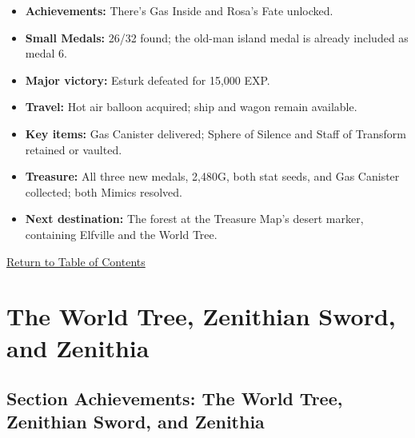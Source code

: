 \documentclass[
  american,
  10pt,
  letterpaper,
  oneside,
  open=any]{scrreprt}
\providecommand{\tightlist}{%
  \setlength{\itemsep}{0pt}\setlength{\parskip}{0pt}}
\begin{document}
\begin{itemize}
\tightlist
\item
  \textbf{Achievements:} There's Gas Inside and Rosa's Fate unlocked.
\item
  \textbf{Small Medals:} 26/32 found; the old-man island medal is
  already included as medal 6.
\item
  \textbf{Major victory:} Esturk defeated for 15,000 EXP.
\item
  \textbf{Travel:} Hot air balloon acquired; ship and wagon remain
  available.
\item
  \textbf{Key items:} Gas Canister delivered; Sphere of Silence and
  Staff of Transform retained or vaulted.
\item
  \textbf{Treasure:} All three new medals, 2,480G, both stat seeds, and
  Gas Canister collected; both Mimics resolved.
\item
  \textbf{Next destination:} The forest at the Treasure Map's desert
  marker, containing Elfville and the World Tree.
\end{itemize}

\hyperref[table-of-contents]{Return to Table of Contents}

\chapter{The World Tree, Zenithian Sword, and
Zenithia}\label{the-world-tree-zenithian-sword-and-zenithia}

\section{Section Achievements: The World Tree, Zenithian Sword, and
Zenithia}\label{section-achievements-the-world-tree-zenithian-sword-and-zenithia}
\end{document}
